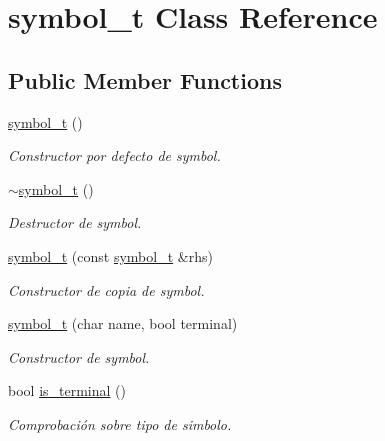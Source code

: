 \hypertarget{classsymbol__t}{}\section{symbol\+\_\+t Class Reference}
\label{classsymbol__t}
\subsection*{Public Member Functions}
\begin{DoxyCompactItemize}
\item 
\mbox{\label{classsymbol__t_a7e95625c80555bb1efc8e441c8e458cc}} 
\hyperlink{classsymbol__t_a7e95625c80555bb1efc8e441c8e458cc}{symbol\+\_\+t} ()
\begin{DoxyCompactList}\small\item\em Constructor por defecto de symbol. \end{DoxyCompactList}\item 
\mbox{\label{classsymbol__t_accaf5584cd78dac02dcf4f481267738d}} 
\hyperlink{classsymbol__t_accaf5584cd78dac02dcf4f481267738d}{$\sim$symbol\+\_\+t} ()
\begin{DoxyCompactList}\small\item\em Destructor de symbol. \end{DoxyCompactList}\item 
\hyperlink{classsymbol__t_a5963b7026ab86ce4d7f906129b513a2e}{symbol\+\_\+t} (const \hyperlink{classsymbol__t}{symbol\+\_\+t} \&rhs)
\begin{DoxyCompactList}\small\item\em Constructor de copia de symbol. \end{DoxyCompactList}\item 
\hyperlink{classsymbol__t_ad9304527975819991abbf747c3147ccc}{symbol\+\_\+t} (char name, bool terminal)
\begin{DoxyCompactList}\small\item\em Constructor de symbol. \end{DoxyCompactList}\item 
bool \hyperlink{classsymbol__t_a916bb3bc6598f17d505dbf2cfaf03b00}{is\+\_\+terminal} ()
\begin{DoxyCompactList}\small\item\em Comprobación sobre tipo de simbolo. \end{DoxyCompactList}\item 

\end{DoxyCompactItemize}
